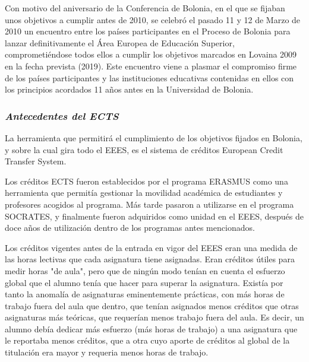 		Con motivo del aniversario de la Conferencia de Bolonia, en el que se fijaban unos objetivos a cumplir antes de 2010, se celebró el pasado 11 y 12 de Marzo de 2010 un encuentro entre los países participantes en el Proceso de Bolonia para lanzar definitivamente el Área Europea de Educación Superior, comprometiéndose todos ellos a cumplir los objetivos marcados en Lovaina 2009 en la fecha prevista (2019). Este encuentro viene a plasmar el compromiso firme de los países participantes y las instituciones educativas contenidas en ellos con los principios acordados 11 años antes en la Universidad de Bolonia.
      
      
		\subsubsection{\bfseries \itshape Antecedentes del ECTS}
      
		La herramienta que permitirá el cumplimiento de los objetivos fijados en Bolonia, y sobre la cual gira todo el EEES, es el sistema de créditos European Credit Transfer System.
		    
		Los créditos ECTS fueron establecidos\cite{ECTS-GUIA:2004} por el programa ERASMUS como una herramienta que permitía gestionar la movilidad académica de estudiantes y profesores acogidos al programa. Más tarde pasaron a utilizarse en el programa SOCRATES, y finalmente fueron adquiridos como unidad en el EEES, después de doce años de utilización dentro de los programas antes mencionados.
    
		Los créditos vigentes antes de la entrada en vigor del EEES eran una medida de las horas lectivas que cada asignatura tiene asignadas. Eran créditos útiles para medir horas "de aula", pero que de ningún modo tenían en cuenta el esfuerzo global que el alumno tenía que hacer para superar la asignatura. Existía por tanto la anomalía de asignaturas eminentemente prácticas, con más horas de trabajo fuera del aula que dentro, que tenían asignados menos créditos que otras asignaturas más teóricas, que requerían menos trabajo fuera del aula. Es decir, un alumno debía dedicar más esfuerzo (más horas de trabajo) a una asignatura que le reportaba menos créditos, que a otra cuyo aporte de créditos al global de la titulación era mayor y requeria menos horas de trabajo.
    
